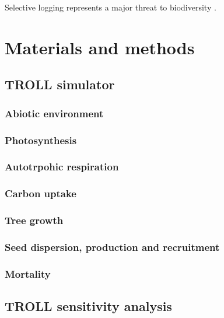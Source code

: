 \documentclass[]{article}
\begin{document}
Selective logging represents a major threat to biodiversity
\citep{Gibson2013}.

\section{Materials and methods}\label{materials-and-methods}

\subsection{TROLL simulator}\label{troll-simulator}

\subsubsection{Abiotic environment}\label{abiotic-environment}

\subsubsection{Photosynthesis}\label{photosynthesis}

\subsubsection{Autotrpohic respiration}\label{autotrpohic-respiration}

\subsubsection{Carbon uptake}\label{carbon-uptake}

\subsubsection{Tree growth}\label{tree-growth}

\subsubsection{Seed dispersion, production and
recruitment}\label{seed-dispersion-production-and-recruitment}

\subsubsection{Mortality}\label{mortality}

\subsection{TROLL sensitivity
analysis}\label{troll-sensitivity-analysis}
\end{document}
